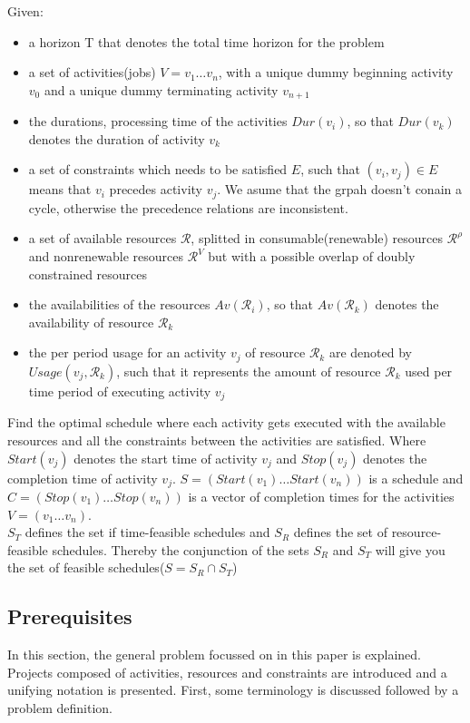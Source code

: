 \documentclass{article}
\begin{document}
Given:
\begin{itemize}
\item a horizon T that denotes the total time horizon for the problem
\item a set of activities(jobs) $V = v_1 \ldots v_n$, with a unique dummy beginning activity $v_0$ and a unique dummy terminating activity $v_{n+1}$
\item the durations, processing time of the activities $Dur(v_i)$, so that $Dur(v_k)$ denotes the duration of activity $v_k$
\item a set of constraints which needs to be satisfied $E$, such that $(v_i,v_j) \in E$ means that $v_i$ precedes activity $v_j$. We asume that the grpah doesn't conain a cycle, otherwise the precedence relations are inconsistent.
\item a set of available resources $\mathcal{R}$, splitted in consumable(renewable) resources $\mathcal{R}^{\rho}$ and nonrenewable resources $\mathcal{R}^V$ but with a possible overlap of doubly constrained resources
\item the availabilities of the resources $Av(\mathcal{R}_i)$, so that $Av(\mathcal{R}_k)$ denotes the availability of resource $\mathcal{R}_k$
\item the per period usage for an activity $v_j$ of resource $\mathcal{R}_k$ are denoted by $Usage(v_j, \mathcal{R}_k)$, such that it represents the amount of resource $\mathcal{R}_k$ used per time period of executing activity $v_j$
\end{itemize}

Find the optimal schedule where each activity gets executed with the available resources and all the constraints between the activities are satisfied. Where $Start(v_j)$ denotes the start time of activity $v_j$ and $Stop(v_j)$ denotes the completion time of activity $v_j$. $S = (Start(v_1) \ldots Start(v_n))$ is a schedule and $C = (Stop(v_1) \ldots Stop(v_n))$ is a vector of completion times for the activities $V = (v_1 \ldots v_n)$. \\
$S_T$ defines the set if time-feasible schedules and $S_R$ defines the set of resource-feasible schedules. Thereby the conjunction of the sets $S_R$ and $S_T$ will give you the set of feasible schedules($S = S_R \cap S_T$)

\subsection{Prerequisites}
In this section, the general problem focussed on in this paper is explained. Projects composed of activities, resources and constraints are introduced and a unifying notation is presented. First, some terminology is discussed followed by a problem definition.
\end{document}
